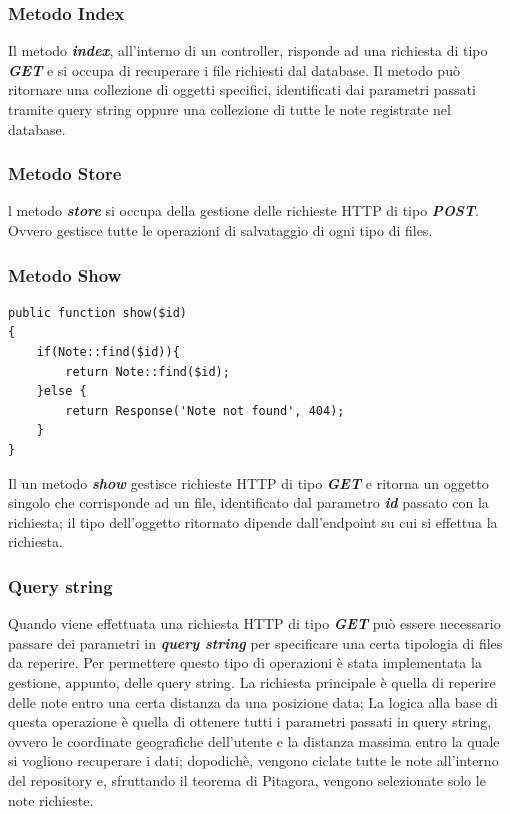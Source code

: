 \pagebreak
\subsubsection{Metodo Index}
Il metodo \textit{\textbf{index}}, all'interno di un controller, risponde ad una richiesta di tipo \textit{\textbf{GET}} e si occupa di recuperare i file richiesti dal database. Il metodo può ritornare una collezione di oggetti specifici, identificati dai parametri passati tramite query string oppure una collezione di tutte le note registrate nel database.

\subsubsection{Metodo Store}
l metodo \textit{\textbf{store}} si occupa della gestione delle richieste HTTP di tipo \textit{\textbf{POST}}. 
Ovvero gestisce tutte le operazioni di salvataggio di ogni tipo di files.

\subsubsection{Metodo Show}
\begin{lstlisting}[caption={Funzione Show del controller NoteController}]
public function show($id) 
{
	if(Note::find($id)){
		return Note::find($id);
	}else {
		return Response('Note not found', 404);
	}
}
\end{lstlisting}

Il un metodo \textit{\textbf{show}} gestisce richieste HTTP di tipo \textit{\textbf{GET}} e ritorna un oggetto singolo che corrisponde ad un file, identificato dal parametro \textit{\textbf{id}} passato con la richiesta; il tipo dell'oggetto ritornato dipende dall'endpoint su cui si effettua la richiesta.

\subsubsection{Query string}
Quando viene effettuata una richiesta HTTP di tipo \textit{\textbf{GET}} può essere necessario passare dei parametri in \textit{\textbf{query string}} per specificare una certa tipologia di files da reperire.
Per permettere questo tipo di operazioni è stata implementata la gestione, appunto, delle query string.
La richiesta principale è quella di reperire delle note entro una certa distanza da una posizione data; La logica alla base di questa operazione è quella di ottenere tutti i parametri passati in query string, ovvero le coordinate geografiche dell'utente e la distanza massima entro la quale si vogliono recuperare i dati; dopodichè, vengono ciclate tutte le note all'interno del repository e, sfruttando il teorema di Pitagora, vengono selezionate solo le note richieste.

